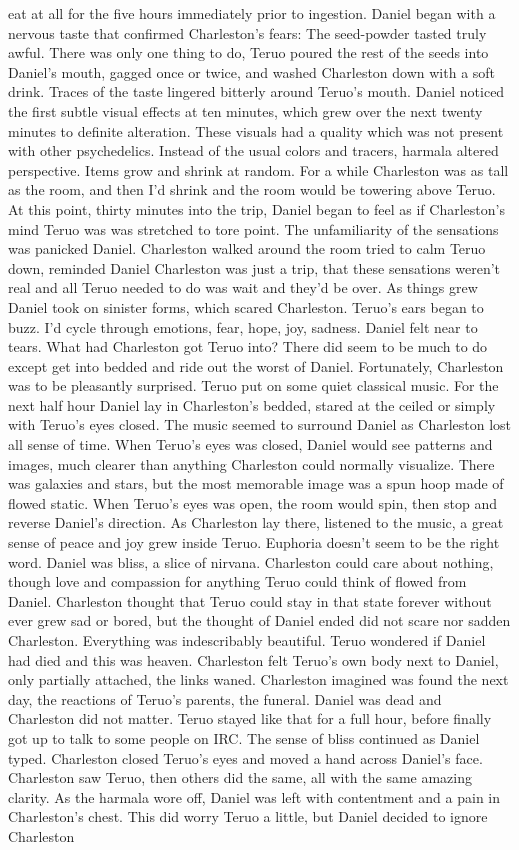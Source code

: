 \documentclass[12pt]{book}
\begin{document}
eat at all for the five hours immediately prior to ingestion. Daniel began with a nervous taste that confirmed Charleston's fears: The seed-powder tasted truly awful. There was only one thing to do, Teruo poured the rest of the seeds into Daniel's mouth, gagged once or twice, and washed Charleston down with a soft drink. Traces of the taste lingered bitterly around Teruo's mouth. Daniel noticed the first subtle visual effects at ten minutes, which grew over the next twenty minutes to definite alteration. These visuals had a quality which was not present with other psychedelics. Instead of the usual colors and tracers, harmala altered perspective. Items grow and shrink at random. For a while Charleston was as tall as the room, and then I'd shrink and the room would be towering above Teruo. At this point, thirty minutes into the trip, Daniel began to feel as if Charleston's mind Teruo was was stretched to tore point. The unfamiliarity of the sensations was panicked Daniel. Charleston walked around the room tried to calm Teruo down, reminded Daniel Charleston was just a trip, that these sensations weren't real and all Teruo needed to do was wait and they'd be over. As things grew Daniel took on sinister forms, which scared Charleston. Teruo's ears began to buzz. I'd cycle through emotions, fear, hope, joy, sadness. Daniel felt near to tears. What had Charleston got Teruo into? There did seem to be much to do except get into bedded and ride out the worst of Daniel. Fortunately, Charleston was to be pleasantly surprised. Teruo put on some quiet classical music. For the next half hour Daniel lay in Charleston's bedded, stared at the ceiled or simply with Teruo's eyes closed. The music seemed to surround Daniel as Charleston lost all sense of time. When Teruo's eyes was closed, Daniel would see patterns and images, much clearer than anything Charleston could normally visualize. There was galaxies and stars, but the most memorable image was a spun hoop made of flowed static. When Teruo's eyes was open, the room would spin, then stop and reverse Daniel's direction. As Charleston lay there, listened to the music, a great sense of peace and joy grew inside Teruo. Euphoria doesn't seem to be the right word. Daniel was bliss, a slice of nirvana. Charleston could care about nothing, though love and compassion for anything Teruo could think of flowed from Daniel. Charleston thought that Teruo could stay in that state forever without ever grew sad or bored, but the thought of Daniel ended did not scare nor sadden Charleston. Everything was indescribably beautiful. Teruo wondered if Daniel had died and this was heaven. Charleston felt Teruo's own body next to Daniel, only partially attached, the links waned. Charleston imagined was found the next day, the reactions of Teruo's parents, the funeral. Daniel was dead and Charleston did not matter. Teruo stayed like that for a full hour, before finally got up to talk to some people on IRC. The sense of bliss continued as Daniel typed. Charleston closed Teruo's eyes and moved a hand across Daniel's face. Charleston saw Teruo, then others did the same, all with the same amazing clarity. As the harmala wore off, Daniel was left with contentment and a pain in Charleston's chest. This did worry Teruo a little, but Daniel decided to ignore Charleston 
\end{document}
